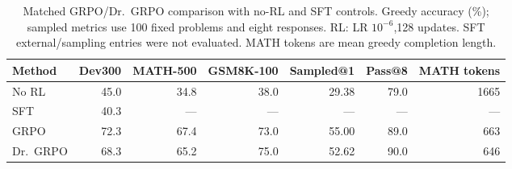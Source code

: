 \begin{table}[t]
\centering
\caption{Matched GRPO/Dr.~GRPO comparison with no-RL and SFT controls. Greedy accuracy (\%); sampled metrics use 100 fixed problems and eight responses. RL: LR $10^{-6}$,128 updates. SFT external/sampling entries were not evaluated. MATH tokens are mean greedy completion length.}
\label{tab:methods}
\footnotesize
\setlength{\tabcolsep}{4pt}
\begin{tabular}{lrrrrrr}
\toprule
Method & Dev300 & MATH-500 & GSM8K-100 & Sampled@1 & Pass@8 & MATH tokens\\
\midrule
No RL & 45.0 & 34.8 & 38.0 & 29.38 & 79.0 & 1665\\
SFT & 40.3 & --- & --- & --- & --- & ---\\
GRPO & 72.3 & 67.4 & 73.0 & 55.00 & 89.0 & 663\\
Dr.~GRPO & 68.3 & 65.2 & 75.0 & 52.62 & 90.0 & 646\\
\bottomrule
\end{tabular}
\end{table}
